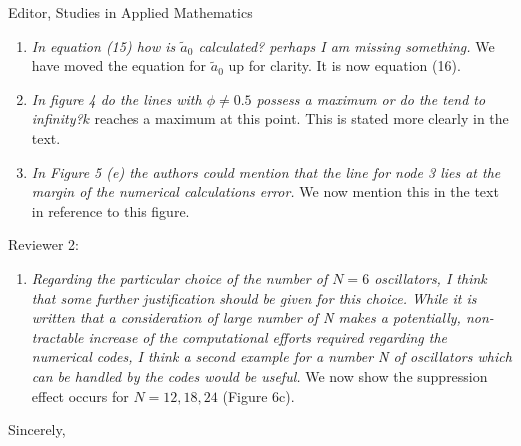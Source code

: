 \documentclass[11pt]{letter}
\begin{document}
\begin{letter}{Editor, Studies in Applied Mathematics}
\begin{enumerate}
    \item \emph{In equation (15) how is $\tilde{a}_0$ calculated? perhaps I am missing something.} We have moved the equation for $\tilde{a}_0$ up for clarity. It is now equation (16). 
    \vspace{4mm}

    \item \emph{In figure 4 do the lines with $\phi\neq0.5$ possess a maximum or do the tend to infinity?}$k$ reaches a maximum at this point. This is stated more clearly in the text.
    \vspace{4mm}

    \item \emph{In Figure 5 (e) the authors could mention that the line for node 3 lies at the margin of the numerical calculations error.} We now mention this in the text in reference to this figure.
    \vspace{4mm}
\end{enumerate}

Reviewer 2:
\begin{enumerate}
    \item \emph{Regarding the particular choice of the number of $N = 6$ oscillators, I think that some further justification should be given for this choice. While it is written that a consideration of large number of N makes a potentially, non-tractable increase of the computational efforts required regarding the numerical codes, I think a second example for a number N of oscillators which can be handled by the codes would be useful.} We now show the suppression effect occurs for $N=12,18,24$ (Figure 6c).
\end{enumerate}

\closing{Sincerely,}

\end{letter}
\end{document}
